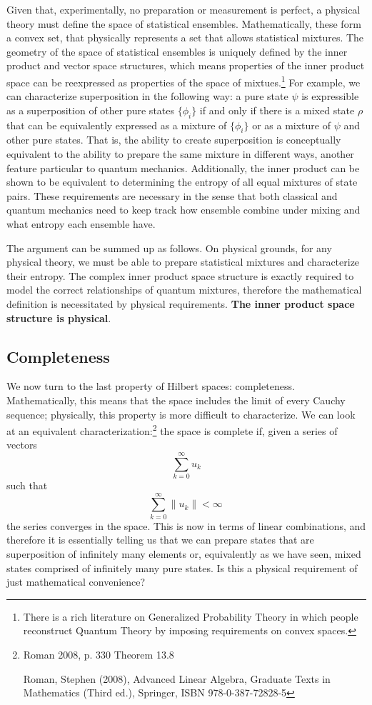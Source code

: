 \documentclass[10pt,twocolumn, nofootinbib]{revtex4-2}
\begin{document}
Given that, experimentally, no preparation or measurement is perfect, a physical theory must define the space of statistical ensembles. Mathematically, these form a convex set, that physically represents a set that allows statistical mixtures. The geometry of the space of statistical ensembles is uniquely defined by the inner product and vector space structures, which means properties of the inner product space can be reexpressed as properties of the space of mixtues.\footnote{There is a rich literature on Generalized Probability Theory in which people reconstruct Quantum Theory by imposing requirements on convex spaces.} For example, we can characterize superposition in the following way: a pure state $\psi$ is expressible as a superposition of other pure states $\{\phi_i\}$ if and only if there is a mixed state $\rho$ that can be equivalently expressed as a mixture of $\{\phi_i\}$ or as a mixture of $\psi$ and other pure states. That is, the ability to create superposition is conceptually equivalent to the ability to prepare the same mixture in different ways, another feature particular to quantum mechanics. Additionally, the inner product can be shown to be equivalent to determining the entropy of all equal mixtures of state pairs. These requirements are necessary in the sense that both classical and quantum mechanics need to keep track how ensemble combine under mixing and what entropy each ensemble have.

The argument can be summed up as follows. On physical grounds, for any physical theory, we must be able to prepare statistical mixtures and characterize their entropy. The complex inner product space structure is exactly required to model the correct relationships of quantum mixtures, therefore the mathematical definition is necessitated by physical requirements. \textbf{The inner product space structure is physical}.

\subsection{Completeness}

We now turn to the last property of Hilbert spaces: completeness. Mathematically, this means that the space includes the limit of every Cauchy sequence; physically, this property is more difficult to characterize. We can look at an equivalent characterization:\cite{roman_2008}\footnote{Roman 2008, p. 330 Theorem 13.8
	
	Roman, Stephen (2008), Advanced Linear Algebra, Graduate Texts in Mathematics (Third ed.), Springer, ISBN 978-0-387-72828-5} the space is complete if, given a series of vectors
$$ \sum _{k=0}^{\infty }u_{k}$$
such that
$$ \sum _{k=0}^{\infty }\|u_{k}\|<\infty \,$$
the series converges in the space. This is now in terms of linear combinations, and therefore it is essentially telling us that we can prepare states that are superposition of infinitely many elements or, equivalently as we have seen, mixed states comprised of infinitely many pure states. Is this a physical requirement of just mathematical convenience?
\end{document}
